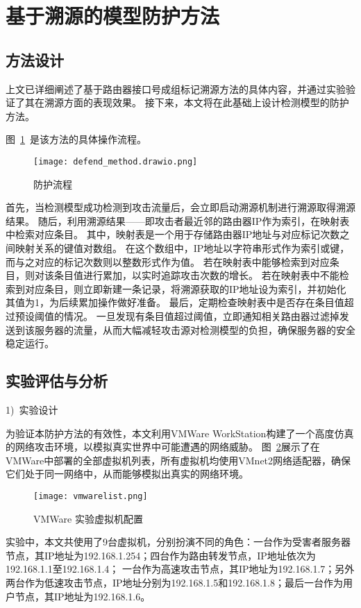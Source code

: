 \section{基于溯源的模型防护方法}
\subsection{方法设计}
上文已详细阐述了基于路由器接口号成组标记溯源方法的具体内容，并通过实验验证了其在溯源方面的表现效果。
接下来，本文将在此基础上设计检测模型的防护方法。\par
图~\ref{fig:defend_procedure}~是该方法的具体操作流程。
\begin{figure}[h]
	\centering
	\texttt{[image: defend\_method.drawio.png]}
	\caption{防护流程}
	\label{fig:defend_procedure}
\end{figure}
首先，当检测模型成功检测到攻击流量后，会立即启动溯源机制进行溯源取得溯源结果。
随后，利用溯源结果——即攻击者最近邻的路由器IP作为索引，在映射表中检索对应条目。
其中，映射表是一个用于存储路由器IP地址与对应标记次数之间映射关系的键值对数组。
在这个数组中，IP地址以字符串形式作为索引或键，而与之对应的标记次数则以整数形式作为值。
若在映射表中能够检索到对应条目，则对该条目值进行累加，以实时追踪攻击次数的增长。
若在映射表中不能检索到对应条目，则立即新建一条记录，将溯源获取的IP地址设为索引，并初始化其值为1，为后续累加操作做好准备。
最后，定期检查映射表中是否存在条目值超过预设阈值的情况。
一旦发现有条目值超过阈值，立即通知相关路由器过滤掉发送到该服务器的流量，从而大幅减轻攻击源对检测模型的负担，确保服务器的安全稳定运行。


\subsection{实验评估与分析}
1)~实验设计\par
为验证本防护方法的有效性，本文利用VMWare WorkStation构建了一个高度仿真的网络攻击环境，以模拟真实世界中可能遭遇的网络威胁。
图~\ref{fig:vmwarelist}展示了在VMWare中部署的全部虚拟机列表，所有虚拟机均使用VMnet2网络适配器，确保它们处于同一网络中，从而能够模拟出真实的网络环境。
\begin{figure}[h]
	\centering
	\texttt{[image: vmwarelist.png]}
	\caption{VMWare 实验虚拟机配置}
	\label{fig:vmwarelist}
\end{figure}
实验中，本文共使用了9台虚拟机，分别扮演不同的角色：一台作为受害者服务器节点，其IP地址为192.168.1.254；四台作为路由转发节点，IP地址依次为192.168.1.1至192.168.1.4；
一台作为高速攻击节点，其IP地址为192.168.1.7；另外两台作为低速攻击节点，IP地址分别为192.168.1.5和192.168.1.8；最后一台作为用户节点，其IP地址为192.168.1.6。\par

